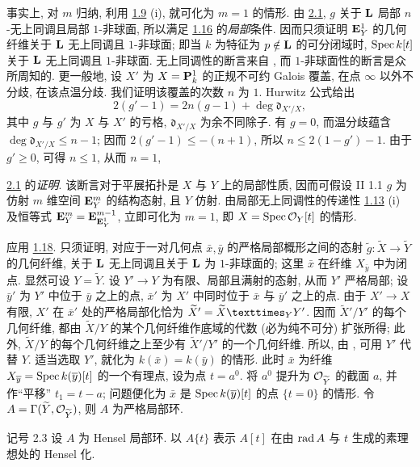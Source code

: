 事实上, 对 $m$ 归纳, 利用 \hyperref[XV.prop1.9]{1.9} (i), 就可化为 $m=1$ 的情形. 由 \hyperref[XV.thm2.1]{2.1}, $g$ 关于 $\LL$ 局部 $n$-无上同调且局部 $1$-非球面, 所以满足 \hyperref[XV.cor1.16]{1.16} 的\emph{局部}条件. 因而只须证明 $\EE^1_Y$ 的几何纤维关于 $\LL$ 无上同调且 $1$-非球面; 即当 $k$ 为特征为 $p\notin\LL$ 的可分闭域时, $\Spec k[t]$ 关于 $\LL$ 无上同调且 $1$-非球面. 无上同调性的断言来自 , 而 $1$-非球面性的断言是众所周知的. 更一般地, 设 $X'$ 为 $X=\PP^1_k$ 的正规不可约 Galois 覆盖, 在点 $\infty$ 以外不分歧, 在该点温分歧. 我们证明该覆盖的次数 $n$ 为 $1$. Hurwitz 公式给出
$$
2(g'-1)=2n(g-1)+\deg \mathfrak{d}_{X'/X},
$$
其中 $g$ 与 $g'$ 为 $X$ 与 $X'$ 的亏格, $\mathfrak{d}_{X'/X}$ 为余不同除子. 有 $g=0$, 而温分歧蕴含 $\deg \mathfrak{d}_{X'/X}\leq n-1$; 因而 $2(g'-1)\leq-(n+1)$, 所以 $n\leq2(1-g')-1$. 由于 $g'\geq0$, 可得 $n\leq1$, 从而 $n=1$, \cqfd

\medskip
\noindent
\hyperref[XV.thm2.1]{2.1} 的\emph{证明}. 该断言对于平展拓扑是 $X$ 与 $Y$ 上的局部性质, 因而可假设 \sisi{(}{} II 1.1\sisi{)}{} $g$ 为仿射 $m$ 维空间 $\EE^m_Y$ 的结构态射, 且 $Y$ 仿射. 由局部无上同调性的传递性 \hyperref[XV.prop1.13]{1.13} (i) 及恒等式 $\EE^m_Y=\EE^{m-1}_{\EE^1_Y}$, 立即可化为 $m=1$, 即 $X=\Spec\Oo_Y[t]$ 的情形.

应用 \hyperref[XV.cor1.18]{1.18}. 只须证明, 对应于一对几何点 $\bar x,\bar y$ 的严格局部概形之间的态射 $\widetilde g:\widetilde X\rightarrow\widetilde Y$ 的几何纤维, 关于 $\LL$ 无上同调且关于 $\LL$ 为 $1$-非球面的; 这里 $\bar x$ 在纤维 $X_{\bar y}$ 中为闭点. 显然可设 $Y=\widetilde Y$. 设 $Y'\rightarrow Y$ 为有限、局部且满射的态射, 从而 $Y'$ 严格局部; 设 $\bar y'$ 为 $Y'$ 中位于 $\bar y$ 之上的点, $\bar x'$ 为 $X'$ 中同时位于 $\bar x$ 与 $\bar y'$ 之上的点. 由于 $X'\rightarrow X$ 有限, $X'$ 在 $\bar x'$ 处的严格局部化恰为 $\widetilde X'=\fprod{\widetilde X}{Y'}{Y}$. 因而 $\widetilde X'/Y'$ 的每个几何纤维, 都由 $\widetilde X/Y$ 的某个几何纤维作底域的代数 (必为纯不可分) 扩张所得; 此外, $\widetilde X/Y$ 的每个几何纤维之上至少有 $\widetilde X'/Y'$ 的一个几何纤维. 所以, 由 , 可用 $Y'$ 代替 $Y$. 适当选取 $Y'$, 就化为 $k(\bar x)=k(\bar y)$ 的情形. 此时 $\bar x$ 为纤维 $X_{\bar y}=\Spec k(\bar y)[t]$ 的一个有理点, 设为点 $t=a^0$. 将 $a^0$ 提升为 $\Oo_{\sisi{Y}{\widetilde Y}}$ 的截面 $a$, 并作“平移” $t_1=t-a$; 问题便化为 $\bar x$ 是 $\Spec k(\bar y)[t]$ 的点 $\{t=0\}$ 的情形. 令 $A=\Gamma(\sisi{Y}{\widetilde Y},
\Oo_{\sisi{Y}{\widetilde Y}})$, 则 $A$ 为严格局部环.

\begin{enonce*}[remark]{记号 2.3}
设 $A$ 为 Hensel 局部环. 以 $A\{t\}$ 表示 $A[t]$ 在由 $\rad A$ 与 $t$ 生成的素理想处的 Hensel 化.
\end{enonce*}


